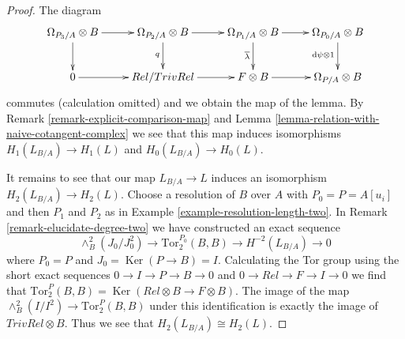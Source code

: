 \documentclass{stacks-project}
\theoremstyle{plain}
\theoremstyle{definition}
\theoremstyle{remark}
\numberwithin{equation}{subsection}
\def\Ker{\mathop{\mathrm{Ker}}}
\begin{document}
\begin{proof}
\medskip\noindent
The diagram
$$
\xymatrix{
\Omega_{P_3/A} \otimes B \ar[r] \ar[d] &
\Omega_{P_2/A} \otimes B \ar[r] \ar[d]_q &
\Omega_{P_1/A} \otimes B \ar[r] \ar[d]_{\overline{\lambda}} &
\Omega_{P_0/A} \otimes B \ar[d]_{\text{d}\psi \otimes 1} \\
0 \ar[r] &
Rel/TrivRel \ar[r] &
F \otimes B \ar[r] &
\Omega_{P/A} \otimes B
}
$$
commutes (calculation omitted) and we obtain the map of the lemma.
By Remark \ref{remark-explicit-comparison-map} and
Lemma \ref{lemma-relation-with-naive-cotangent-complex} we see that this map
induces isomorphisms $H_1(L_{B/A}) \to H_1(L)$ and $H_0(L_{B/A}) \to H_0(L)$.

\medskip\noindent
It remains to see that our map $L_{B/A} \to L$ induces an isomorphism
$H_2(L_{B/A}) \to H_2(L)$. Choose a resolution of $B$ over $A$ with
$P_0 = P = A[u_i]$ and then $P_1$ and $P_2$ as in
Example \ref{example-resolution-length-two}.
In Remark \ref{remark-elucidate-degree-two} we have constructed an exact
sequence
$$
\wedge^2_B(J_0/J_0^2) \to \text{Tor}_2^{P_0}(B, B) \to H^{-2}(L_{B/A}) \to 0
$$
where $P_0 = P$ and $J_0 = \Ker(P \to B) = I$.
Calculating the Tor group using the short exact sequences
$0 \to I \to P \to B \to 0$ and $0 \to Rel \to F \to I \to 0$
we find that
$\text{Tor}_2^P(B, B) = \Ker(Rel \otimes B \to F \otimes B)$.
The image of the map $\wedge^2_B(I/I^2) \to \text{Tor}_2^P(B, B)$
under this identification is exactly the image of $TrivRel \otimes B$.
Thus we see that $H_2(L_{B/A}) \cong H_2(L)$.


\end{proof}
\end{document}
